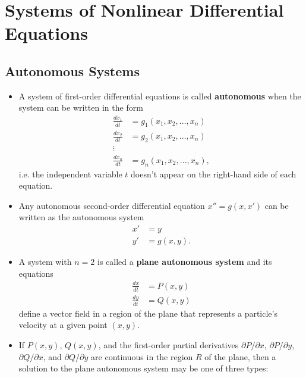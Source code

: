 \documentclass{article}
\begin{document}
\section{Systems of Nonlinear Differential Equations}

\subsection{Autonomous Systems}

\begin{itemize}
  \item A system of first-order differential equations is called \textbf{autonomous} when the system can be written in the form \begin{align*}
          \frac{d x_1}{d t} & = g_1(x_1, x_2, \ldots, x_n)  \\
          \frac{d x_2}{d t} & = g_2(x_1, x_2, \ldots, x_n)  \\
          \vdots                                            \\
          \frac{d x_n}{d t} & = g_n(x_1, x_2, \ldots, x_n),
        \end{align*} i.e. the independent variable $t$ doesn't appear on the right-hand side of each equation.

  \item Any autonomous second-order differential equation $x'' = g(x, x')$ can be written as the autonomous system \begin{align*}
          x' & = y        \\
          y' & = g(x, y).
        \end{align*}

  \item A system with $n = 2$ is called a \textbf{plane autonomous system} and its equations \begin{align*}
          \frac{d x}{d t} & = P(x, y) \\
          \frac{d y}{d t} & = Q(x, y)
        \end{align*} define a vector field in a region of the plane that represents a particle's velocity at a given point $(x, y)$.

  \item If $P(x, y)$, $Q(x, y)$, and the first-order partial derivatives $\partial P / \partial x$, $\partial P / \partial y$, $\partial Q / \partial x$, and $\partial Q / \partial y$ are continuous in the region $R$ of the plane, then a solution to the plane autonomous system may be one of three types:


\end{itemize}
\end{document}
